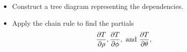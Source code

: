 \begin{activity}
  \begin{itemize}
    \item Construct a tree diagram representing the dependencies.
    \item Apply the chain rule to find the partials
      $$
      \frac{\partial T}{\partial\rho},
      \frac{\partial T}{\partial\phi},
      \ 
      \mbox{and}
      \ 
      \frac{\partial T}{\partial\theta},
      \hspace*{20pt}
      $$
    \end{itemize}

  \ea

\end{activity} 
\afterpa 
